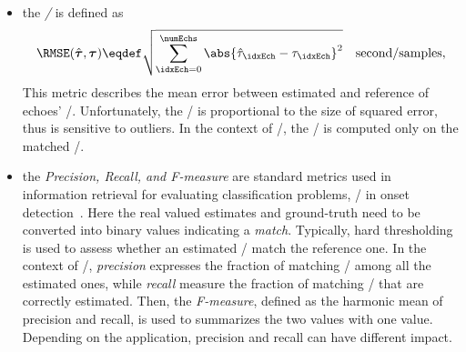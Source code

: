 \begin{itemize}
    \item the \textit{\RMSEtxt/} is defined as
    \begin{equation}
        \RMSE(\hat{\boldsymbol{\tau}}, \boldsymbol{\tau}) \eqdef \sqrt{\sum_{\idxEch=0}^{\numEchs} \abs{\hat{\tau}_\idxEch - \tau_\idxEch}^2} \quad \text{second/samples}
        ,
    \end{equation}
    This metric describes the mean error between estimated and reference of echoes' \TOAs/.
    Unfortunately, the \RMSEtxt/ is proportional to the size of squared error, thus is sensitive to outliers.
    In the context of \AER/, the \RMSEtxt/ is computed only on the matched \TOAs/.

    \item the \textit{Precision, Recall, and F-measure} are standard metrics used in information retrieval for evaluating classification problems, \eg/ in onset detection~.
    Here the real valued estimates and ground-truth need to be converted into binary values indicating a \textit{match}.
    Typically, hard thresholding is used to assess whether an estimated \TOAs/ match the reference one.
    In the context of \AER/, \textit{precision} expresses the fraction of matching \TOAs/ among all the estimated ones, while \textit{recall} measure the fraction of matching \TOAs/ that are correctly estimated.
    Then, the \textit{F-measure}, defined as the harmonic mean of precision and recall, is used to summarizes the two values with one value.
    Depending on the application, precision and recall can have different impact.

\end{itemize}
